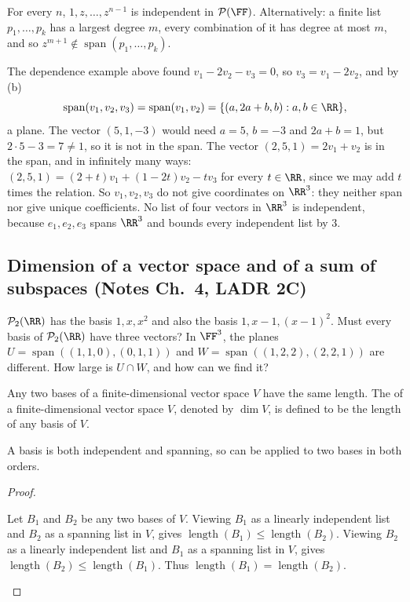 \documentclass[10pt]{scrartcl}
\DeclareMathOperator{\spn}{span}
\newcommand{\PP}{\mathcal P}
\begin{document}
\begin{example*}[$\PP(\FF)$ is infinite-dimensional (LADR 2.14)]
  For every $n$, $1,z,\dots,z^{n-1}$ is independent in $\PP(\FF)$. Alternatively: a finite list $p_1,\dots,p_k$ has a largest degree $m$, every combination of it has degree at most $m$, and so $z^{m+1}\notin\spn(p_1,\dots,p_k)$.
\end{example*}

\revisit The dependence example above found $v_1-2v_2-v_3=0$, so $v_3=v_1-2v_2$, and by (b)
\[
  \spn(v_1,v_2,v_3)=\spn(v_1,v_2)=\{(a,2a+b,b):a,b\in\RR\},
\]
a plane. The vector $(5,1,-3)$ would need $a=5$, $b=-3$ and $2a+b=1$, but $2\cdot5-3=7\ne1$, so it is not in the span. The vector $(2,5,1)=2v_1+v_2$ is in the span, and in infinitely many ways: $(2,5,1)=(2+t)v_1+(1-2t)v_2-tv_3$ for every $t\in\RR$, since we may add $t$ times the relation. So $v_1,v_2,v_3$ do not give coordinates on $\RR^3$: they neither span nor give unique coefficients. No list of four vectors in $\RR^3$ is independent, because $e_1,e_2,e_3$ spans $\RR^3$ and  bounds every independent list by $3$.

\subsection{Dimension of a vector space and of a sum of subspaces (Notes Ch.~4, LADR 2C)}

\begin{qbox}
  $\PP_2(\RR)$ has the basis $1,x,x^2$ and also the basis $1,x-1,(x-1)^2$. Must every basis of $\PP_2(\RR)$ have three vectors? In $\FF^3$, the planes $U=\spn((1,1,0),(0,1,1))$ and $W=\spn((1,2,2),(2,2,1))$ are different. How large is $U\cap W$, and how can we find it?
\end{qbox}

\begin{proposition*}
  Any two bases of a finite-dimensional vector space $V$ have the same length. The  of a finite-dimensional vector space $V$, denoted by $\dim V$, is defined to be the length of any basis of $V$.
\end{proposition*}
\begin{ideabox}
  A basis is both independent and spanning, so  can be applied to two bases in both orders.
\end{ideabox}
\begin{proof}
  \begin{steps}
    \ii Let $B_1$ and $B_2$ be any two bases of $V$. Viewing $B_1$ as a linearly independent list and $B_2$ as a spanning list in $V$,  gives $\operatorname{length}(B_1)\le\operatorname{length}(B_2)$.
    \ii Viewing $B_2$ as a linearly independent list and $B_1$ as a spanning list in $V$,  gives $\operatorname{length}(B_2)\le\operatorname{length}(B_1)$. Thus $\operatorname{length}(B_1)=\operatorname{length}(B_2)$.
  \end{steps}
\end{proof}
\end{document}
